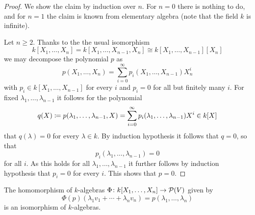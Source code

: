 \begin{proof}
  We show the claim by induction over $n$.
  For $n = 0$ there is nothing to do, and for $n = 1$ the claim is known from elementary algebra (note that the field $k$ is infinite).
  
  Let $n \geq 2$.
  Thanks to the the usual isomorphism
  \[
          k[X_1, \dotsc, X_n]
    =     k[X_1, \dotsc, X_{n-1}, X_n]
    \cong k[X_1, \dotsc, X_{n-1}][X_n]
  \]
  we may decompose the polynomial $p$ as
  \[
      p(X_1, \dotsc, X_n)
    = \sum_{i=0}^\infty p_i(X_1, \dotsc, X_{n-1}) X_n^i
  \]
  with $p_i \in k[X_1, \dotsc, X_{n-1}]$ for every $i$ and $p_i = 0$ for all but finitely many $i$.
  For fixed $\lambda_1, \dotsc, \lambda_{n-1}$ it follows for the polynomial
  \[
              q(X)
    \coloneqq  p(\lambda_1, \dotsc, \lambda_{n-1}, X)
    =         \sum_{i=0}^\infty p_i(\lambda_1, \dotsc, \lambda_{n-1}) X^i
    \in       k[X]
  \]
  that $q(\lambda) = 0$ for every $\lambda \in k$.
  By induction hypothesis it follows that $q = 0$, so that
  \[
      p_i(\lambda_1, \dotsc, \lambda_{n-1})
    = 0
  \]
  for all $i$.
  As this holds for all $\lambda_1, \dotsc, \lambda_{n-1}$ it further follows by induction hypothesis that $p_i = 0$ for every $i$.
  This shows that $p = 0$.
\end{proof}


\begin{corollary}
  \label{corollary: isomorphism poylnomial ring and polynomial maps}
  The homomorphism of $k$-algebras $\Phi \colon k[X_1, \dotsc, X_n] \to \mathcal{P}(V)$ given by
  \[
      \Phi(p)(\lambda_1 v_1 + \dotsb + \lambda_n v_n)
    = p(\lambda_1, \dotsc, \lambda_n)
  \]
  is an isomorphism of $k$-algebras.
\end{corollary}


